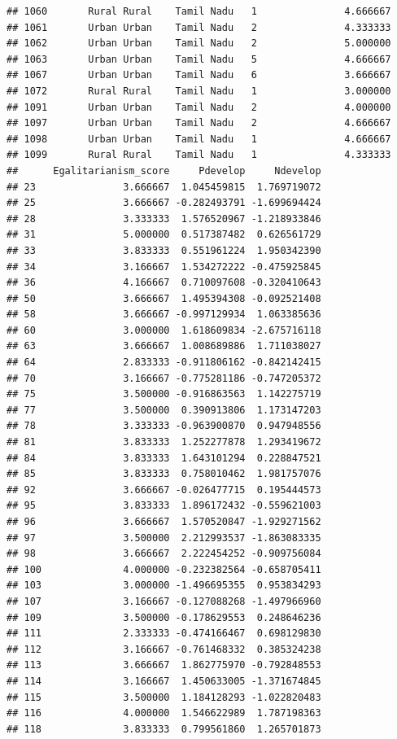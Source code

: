 \documentclass[
]{article}
\begin{document}
\begin{verbatim}
## 1060       Rural Rural    Tamil Nadu   1               4.666667
## 1061       Urban Urban    Tamil Nadu   2               4.333333
## 1062       Urban Urban    Tamil Nadu   2               5.000000
## 1063       Urban Urban    Tamil Nadu   5               4.666667
## 1067       Urban Urban    Tamil Nadu   6               3.666667
## 1072       Rural Rural    Tamil Nadu   1               3.000000
## 1091       Urban Urban    Tamil Nadu   2               4.000000
## 1097       Urban Urban    Tamil Nadu   2               4.666667
## 1098       Urban Urban    Tamil Nadu   1               4.666667
## 1099       Rural Rural    Tamil Nadu   1               4.333333
##      Egalitarianism_score     Pdevelop     Ndevelop
## 23               3.666667  1.045459815  1.769719072
## 25               3.666667 -0.282493791 -1.699694424
## 28               3.333333  1.576520967 -1.218933846
## 31               5.000000  0.517387482  0.626561729
## 33               3.833333  0.551961224  1.950342390
## 34               3.166667  1.534272222 -0.475925845
## 36               4.166667  0.710097608 -0.320410643
## 50               3.666667  1.495394308 -0.092521408
## 58               3.666667 -0.997129934  1.063385636
## 60               3.000000  1.618609834 -2.675716118
## 63               3.666667  1.008689886  1.711038027
## 64               2.833333 -0.911806162 -0.842142415
## 70               3.166667 -0.775281186 -0.747205372
## 75               3.500000 -0.916863563  1.142275719
## 77               3.500000  0.390913806  1.173147203
## 78               3.333333 -0.963900870  0.947948556
## 81               3.833333  1.252277878  1.293419672
## 84               3.833333  1.643101294  0.228847521
## 85               3.833333  0.758010462  1.981757076
## 92               3.666667 -0.026477715  0.195444573
## 95               3.833333  1.896172432 -0.559621003
## 96               3.666667  1.570520847 -1.929271562
## 97               3.500000  2.212993537 -1.863083335
## 98               3.666667  2.222454252 -0.909756084
## 100              4.000000 -0.232382564 -0.658705411
## 103              3.000000 -1.496695355  0.953834293
## 107              3.166667 -0.127088268 -1.497966960
## 109              3.500000 -0.178629553  0.248646236
## 111              2.333333 -0.474166467  0.698129830
## 112              3.166667 -0.761468332  0.385324238
## 113              3.666667  1.862775970 -0.792848553
## 114              3.166667  1.450633005 -1.371674845
## 115              3.500000  1.184128293 -1.022820483
## 116              4.000000  1.546622989  1.787198363
## 118              3.833333  0.799561860  1.265701873

\end{verbatim}
\end{document}
